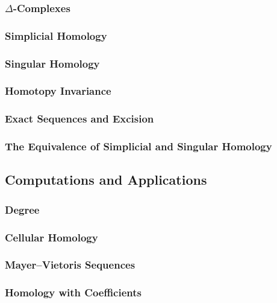 \documentclass[11pt, a4paper]{article}
\begin{document}
\subsubsection{$\Delta$-Complexes}

\subsubsection{Simplicial Homology}

\subsubsection{Singular Homology}

\subsubsection{Homotopy Invariance}

\subsubsection{Exact Sequences and Excision}

\subsubsection{The Equivalence of Simplicial and Singular Homology}

\subsection{Computations and Applications}

\subsubsection{Degree}

\subsubsection{Cellular Homology}

\subsubsection{Mayer--Vietoris Sequences}

\subsubsection{Homology with Coefficients}
\end{document}
